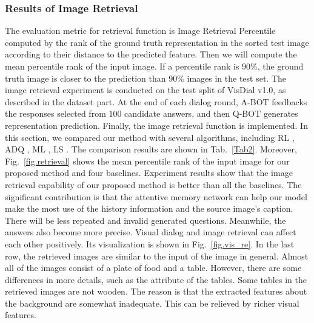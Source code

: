 \documentclass[review]{elsarticle}
\begin{document}
	\subsubsection{Results of Image Retrieval}
	The evaluation metric for retrieval function is Image Retrieval Percentile computed by the rank of the ground truth representation in the sorted test image according to their distance to the predicted feature. 
	Then we will compute the mean percentile rank of the input image. If a percentile rank is $90\%$, the ground truth image is closer to the prediction than $90\%$ images in the test set.
	The image retrieval experiment is conducted on the test split of VisDial v1.0, as described in the dataset part. 
	At the end of each dialog round, A-BOT feedbacks the responses selected from 100 candidate answers, and then Q-BOT generates representation prediction. Finally, the image retrieval function is implemented. In this section, we compared our method with several algorithms, including RL \cite{DBLP:conf/iccv/DasKMLB17}, ADQ \cite{DBLP:conf/emnlp/MurahariCBPD19}, ML \cite{DBLP:conf/atal/AgarwalGSLS19}, LS \cite{DBLP:conf/iclr/LeeGYYH19}. 
	The comparison results are shown in Tab.~\ref{Tab2}. Moreover, Fig.~\ref{fig.retrieval} shows the mean percentile rank of the input image for our proposed method and four baselines. 
	Experiment results show that the image retrieval capability of our proposed method is better than all the baselines. The significant contribution is that the attentive memory network can help our model make the most use of the history information and the source image's caption. 
	There will be less repeated and invalid generated questions. Meanwhile, the answers also become more precise. Visual dialog and image retrieval can affect each other positively. 
	Its visualization is shown in Fig.~\ref{fig.vis_re}. In the last row, the retrieved images are similar to the input of the image in general. Almost all of the images consist of a plate of food and a table. However, there are some differences in more details, such as the attribute of the tables. Some tables in the retrieved images are not wooden. The reason is that the extracted features about the background are somewhat inadequate. This can be relieved by richer visual features.
	
\end{document}
